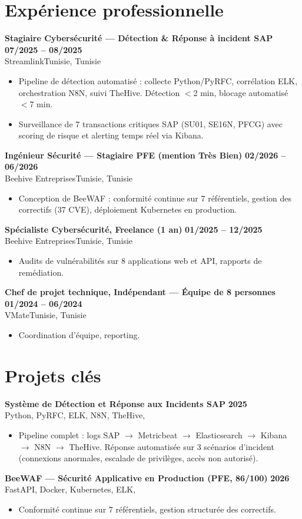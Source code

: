 \documentclass[a4paper,9pt]{article}
\newcommand{\cventry}[4]{\textbf{#1} \hfill \textbf{#4}\\[0.2pt]#2{\ifx\relax#3\relax\else, #3\fi}\par\vspace{0.3pt}}
\begin{document}
\section{Expérience professionnelle}
\cventry{Stagiaire Cybersécurité --- Détection \& Réponse à incident SAP}{Streamlink}{Tunisie}{07/2025 -- 08/2025}
\begin{itemize}
  \item Pipeline de détection automatisé : collecte Python/PyRFC, corrélation ELK, orchestration N8N, suivi TheHive. Détection $<$2 min, blocage automatisé $<$7 min.
  \item Surveillance de 7 transactions critiques SAP (SU01, SE16N, PFCG) avec scoring de risque et alerting temps réel via Kibana.
\end{itemize}
\cventry{Ingénieur Sécurité --- Stagiaire PFE (mention Très Bien)}{Beehive Entreprises}{Tunisie}{02/2026 -- 06/2026}
\begin{itemize}
  \item Conception de BeeWAF : conformité continue sur 7 référentiels, gestion des correctifs (37 CVE), déploiement Kubernetes en production.
\end{itemize}
\cventry{Spécialiste Cybersécurité, Freelance (1 an)}{Beehive Entreprises}{Tunisie}{01/2025 -- 12/2025}
\begin{itemize}
  \item Audits de vulnérabilités sur 8 applications web et API, rapports de remédiation.
\end{itemize}
\cventry{Chef de projet technique, Indépendant --- Équipe de 8 personnes}{VMate}{Tunisie}{01/2024 -- 06/2024}
\begin{itemize}
  \item Coordination d'équipe, reporting.
\end{itemize}
\section{Projets clés}
\cventry{Système de Détection et Réponse aux Incidents SAP}{Python, PyRFC, ELK, N8N, TheHive}{}{2025}
\begin{itemize}
  \item Pipeline complet : logs SAP $\to$ Metricbeat $\to$ Elasticsearch $\to$ Kibana $\to$ N8N $\to$ TheHive. Réponse automatisée sur 3 scénarios d'incident (connexions anormales, escalade de privilèges, accès non autorisé).
\end{itemize}
\cventry{BeeWAF --- Sécurité Applicative en Production (PFE, 86/100)}{FastAPI, Docker, Kubernetes, ELK}{}{2026}
\begin{itemize}
  \item Conformité continue sur 7 référentiels, gestion structurée des correctifs.
\end{itemize}
\end{document}
